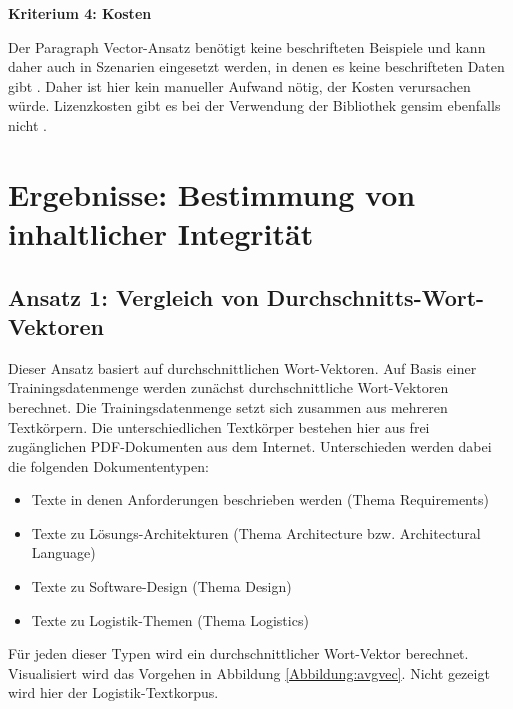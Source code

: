 {\bf Kriterium 4: Kosten}

Der Paragraph Vector-Ansatz benötigt keine beschrifteten Beispiele und kann daher auch in Szenarien eingesetzt werden, in denen es keine beschrifteten Daten gibt \cite[S. 4]{mikolov2014}. Daher ist hier kein manueller Aufwand nötig, der Kosten verursachen würde. Lizenzkosten gibt es bei der Verwendung der Bibliothek gensim ebenfalls nicht \cite{gensim-license}.

\section{Ergebnisse: Bestimmung von inhaltlicher Integrität}

\subsection{Ansatz 1: Vergleich von Durchschnitts-Wort-Vektoren}

Dieser Ansatz basiert auf durchschnittlichen Wort-Vektoren. Auf Basis einer Trainingsdatenmenge werden zunächst durchschnittliche Wort-Vektoren berechnet. Die Trainingsdatenmenge setzt sich zusammen aus mehreren Textkörpern. Die unterschiedlichen Textkörper bestehen hier aus frei zugänglichen PDF-Dokumenten aus dem Internet. Unterschieden werden dabei die folgenden Dokumententypen:

\begin{itemize}
\item Texte in denen Anforderungen beschrieben werden (Thema Requirements)
\item Texte zu Lösungs-Architekturen (Thema Architecture bzw. Architectural Language)
\item Texte zu Software-Design (Thema Design) 
\item Texte zu Logistik-Themen (Thema Logistics)
\end{itemize}

Für jeden dieser Typen wird ein durchschnittlicher Wort-Vektor berechnet. Visualisiert wird das Vorgehen in Abbildung \ref{Abbildung:avgvec}. Nicht gezeigt wird hier der Logistik-Textkorpus.


